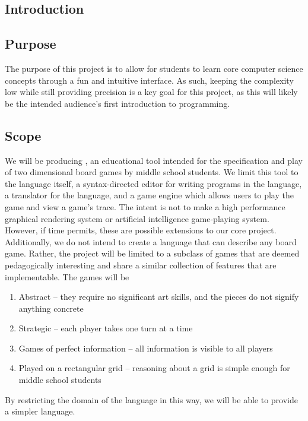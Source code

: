 \documentclass[10pt,letter,draftclsnofoot,onecolumn]{IEEEtran}
\begin{document}
\begin{singlespace}

\tableofcontents
\newpage


\section{Introduction}
    \subsection{Purpose}
        The purpose of this project is to allow for students to learn core computer science concepts through a fun and intuitive interface. As such, keeping the complexity low while still providing precision is a key goal for this project, as this will likely be the intended audience's first introduction to programming.
    \subsection{Scope}
        We will be producing \name, an educational tool intended for the specification and play of two dimensional board games by middle school students. We limit this tool to the language itself, a syntax-directed editor for writing programs in the language, a translator for the language, and a game engine which allows users to play the game and view a game's trace. The intent is not to make a high performance graphical rendering system or artificial intelligence game-playing system. However, if time permits, these are possible extensions to our core project. Additionally, we do not intend to create a language that can describe any board game. Rather, the project will be limited to a subclass of games that are deemed pedagogically interesting and share a similar collection of features that are implementable. The games will be
        \begin{enumerate}
            \item Abstract -- they require no significant art skills, and the pieces do not signify anything concrete
            \item Strategic -- each player takes one turn at a time
            \item Games of perfect information -- all information is visible to all players
            \item Played on a rectangular grid -- reasoning about a grid is simple enough for middle school students
        \end{enumerate}
        By restricting the domain of the language in this way, we will be able to provide a simpler language.
        

\end{singlespace}
\end{document}
